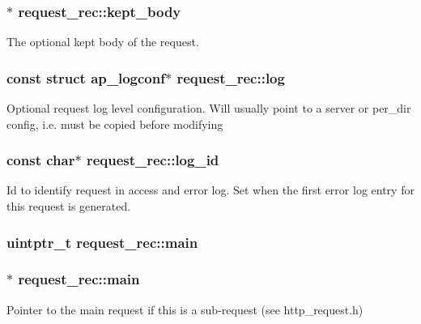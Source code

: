 \subsubsection[{\texorpdfstring{kept\+\_\+body}{kept_body}}]{$\ast$ request\+\_\+rec\+::kept\+\_\+body}\hypertarget{structrequest__rec_a919609b0089e443b7a2f266faf75f656}{}\label{structrequest__rec_a919609b0089e443b7a2f266faf75f656}
The optional kept body of the request. 
\subsubsection[{\texorpdfstring{log}{log}}]{\setlength{\rightskip}{0pt plus 5cm}const struct {\bf ap\+\_\+logconf}$\ast$ request\+\_\+rec\+::log}\hypertarget{structrequest__rec_aa4e9391d311a5332c826c8e69d647c9d}{}\label{structrequest__rec_aa4e9391d311a5332c826c8e69d647c9d}
Optional request log level configuration. Will usually point to a server or per\+\_\+dir config, i.\+e. must be copied before modifying 
\subsubsection[{\texorpdfstring{log\+\_\+id}{log_id}}]{\setlength{\rightskip}{0pt plus 5cm}const char$\ast$ request\+\_\+rec\+::log\+\_\+id}\hypertarget{structrequest__rec_a9c1a387edd3a86bf8516ad3765243d93}{}\label{structrequest__rec_a9c1a387edd3a86bf8516ad3765243d93}
Id to identify request in access and error log. Set when the first error log entry for this request is generated. 
\subsubsection[{\texorpdfstring{main}{main}}]{\setlength{\rightskip}{0pt plus 5cm}uintptr\+\_\+t request\+\_\+rec\+::main}\hypertarget{structrequest__rec_aa15c110738953554b82619d8d2ee25b3}{}\label{structrequest__rec_aa15c110738953554b82619d8d2ee25b3}
\subsubsection[{\texorpdfstring{main}{main}}]{$\ast$ request\+\_\+rec\+::main}\hypertarget{structrequest__rec_ad205770d59e047554b324393d8240758}{}\label{structrequest__rec_ad205770d59e047554b324393d8240758}
Pointer to the main request if this is a sub-\/request (see http\+\_\+request.\+h) 
